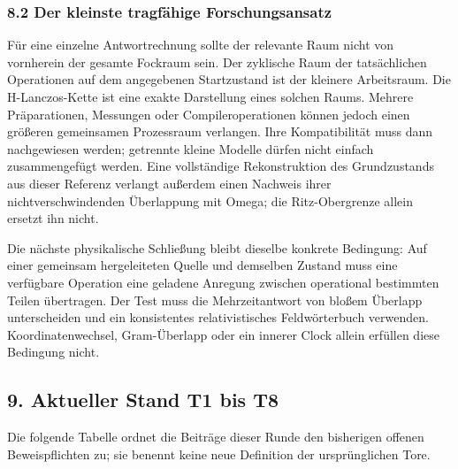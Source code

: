 \subsubsection{8.2 Der kleinste tragfähige
Forschungsansatz}\label{der-kleinste-tragfuxe4hige-forschungsansatz}

Für eine einzelne Antwortrechnung sollte der relevante Raum nicht von
vornherein der gesamte Fockraum sein. Der zyklische Raum der
tatsächlichen Operationen auf dem angegebenen Startzustand ist der
kleinere Arbeitsraum. Die H-Lanczos-Kette ist eine exakte Darstellung
eines solchen Raums. Mehrere Präparationen, Messungen oder
Compileroperationen können jedoch einen größeren gemeinsamen Prozessraum
verlangen. Ihre Kompatibilität muss dann nachgewiesen werden; getrennte
kleine Modelle dürfen nicht einfach zusammengefügt werden. Eine
vollständige Rekonstruktion des Grundzustands aus dieser Referenz
verlangt außerdem einen Nachweis ihrer nichtverschwindenden Überlappung
mit Omega; die Ritz-Obergrenze allein ersetzt ihn nicht.

Die nächste physikalische Schließung bleibt dieselbe konkrete Bedingung:
Auf einer gemeinsam hergeleiteten Quelle und demselben Zustand muss eine
verfügbare Operation eine geladene Anregung zwischen operational
bestimmten Teilen übertragen. Der Test muss die Mehrzeitantwort von
bloßem Überlapp unterscheiden und ein konsistentes relativistisches
Feldwörterbuch verwenden. Koordinatenwechsel, Gram-Überlapp oder ein
innerer Clock allein erfüllen diese Bedingung nicht.

\subsection{9. Aktueller Stand T1 bis
T8}\label{aktueller-stand-t1-bis-t8}

Die folgende Tabelle ordnet die Beiträge dieser Runde den bisherigen
offenen Beweispflichten zu; sie benennt keine neue Definition der
ursprünglichen Tore.

